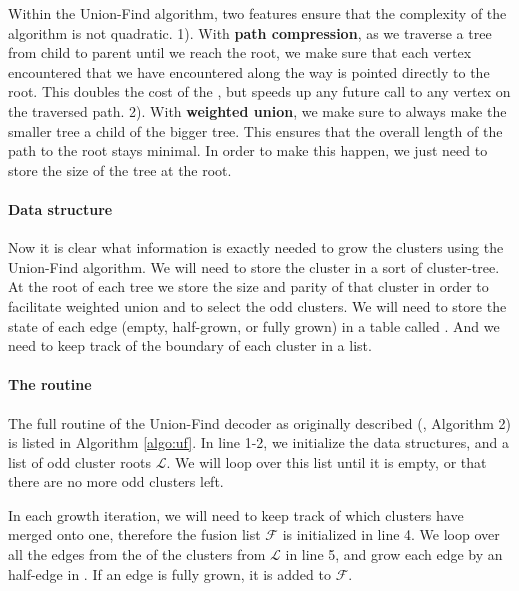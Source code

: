
Within the Union-Find algorithm, two features ensure that the complexity of the algorithm is not quadratic. 1). With \textbf{path compression}, as we traverse a tree from child to parent until we reach the root, we make sure that each vertex encountered that we have encountered along the way is pointed directly to the root. This doubles the cost of the , but speeds up any future call to any vertex on the traversed path. 2). With \textbf{weighted union}, we make sure to always make the smaller tree a child of the bigger tree. This ensures that the overall length of the path to the root stays minimal. In order to make this happen, we just need to store the size of the tree at the root.

\paragraph{Data structure}
Now it is clear what information is exactly needed to grow the clusters using the Union-Find algorithm. We will need to store the cluster in a sort of cluster-tree. At the root of each tree we store the size and parity of that cluster in order to facilitate weighted union and to select the odd clusters. We will need to store the state of each edge (empty, half-grown, or fully grown) in a table called . And we need to keep track of the boundary of each cluster in a  list.

\paragraph{The routine}
The full routine of the Union-Find decoder as originally described (\cite{nickerson2017}, Algorithm 2) is listed in Algorithm \ref{algo:uf}. In line 1-2, we initialize the data structures, and a list of odd cluster roots $\mathcal{L}$. We will loop over this list until it is empty, or that there are no more odd clusters left.

In each growth iteration, we will need to keep track of which clusters have merged onto one, therefore the fusion list $\mathcal{F}$ is initialized in line 4. We loop over all the edges from the  of the clusters from $\mathcal{L}$ in line 5, and grow each edge by an half-edge in . If an edge is fully grown, it is added to $\mathcal{F}$.

